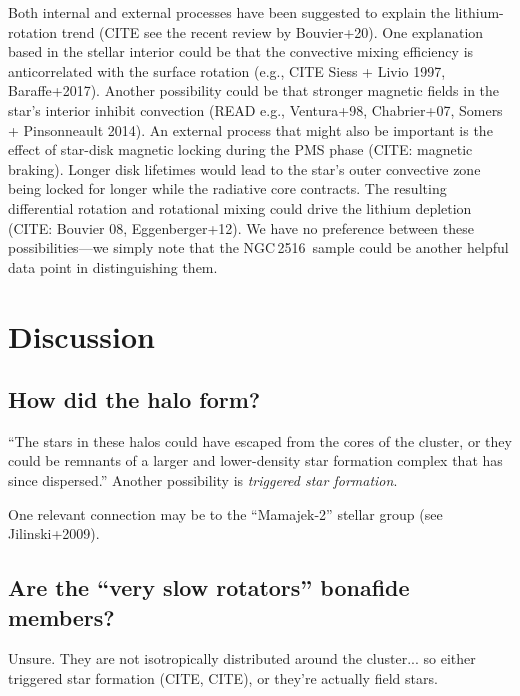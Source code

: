 \documentclass[12pt,twocolumn,tighten]{aastex63}
\newcommand{\cn}{NGC\,2516} %
\begin{document}
Both internal and external processes have been suggested to explain
the lithium-rotation trend (CITE see the recent review by Bouvier+20).
One explanation based in the stellar interior could be that the
convective mixing efficiency is anticorrelated with the surface
rotation (e.g., CITE Siess + Livio 1997, Baraffe+2017).  Another
possibility could be that stronger magnetic fields in the star's
interior inhibit convection (READ e.g., Ventura+98, Chabrier+07,
Somers + Pinsonneault 2014).  An external process that might also be
important is the effect of star-disk magnetic locking during the PMS
phase (CITE: magnetic braking).  Longer disk lifetimes would lead to
the star's outer convective zone being locked for longer while the
radiative core contracts.  The resulting differential rotation and
rotational mixing could drive the lithium depletion (CITE: Bouvier 08,
Eggenberger+12).
We have no preference between these possibilities---we simply note
that the \cn\ sample could be another helpful data point in
distinguishing them.



\section{Discussion}
\label{sec:discussion}

\subsection{How did the halo form?}
``The stars in these halos could have escaped from the cores of the
cluster, or they could be remnants of a larger and lower-density star
formation complex that has since dispersed.''
Another possibility is {\it triggered star formation}.

One relevant connection may be to the ``Mamajek-2'' stellar group
(see Jilinski+2009).





\subsection{Are the ``very slow rotators'' bonafide members?}
Unsure. They are not isotropically distributed around the
cluster... so either triggered star formation (CITE, CITE), or they're
actually field stars.
\end{document}
